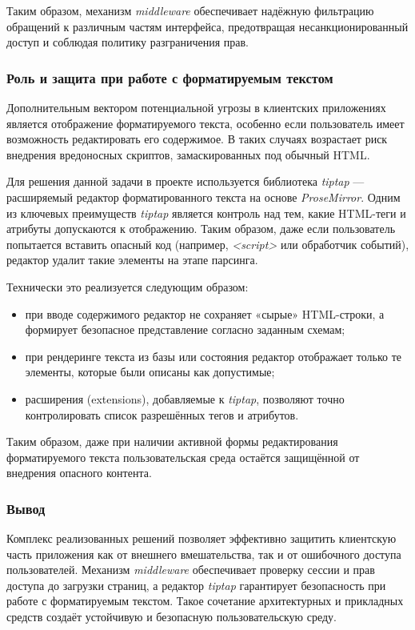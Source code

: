 Таким образом, механизм \textit{middleware} обеспечивает надёжную фильтрацию обращений к различным частям интерфейса, предотвращая несанкционированный доступ и соблюдая политику разграничения прав.

\subsubsection{Роль и защита при работе с форматируемым текстом}
Дополнительным вектором потенциальной угрозы в клиентских приложениях является отображение форматируемого текста, особенно если пользователь имеет возможность редактировать его содержимое. В таких случаях возрастает риск внедрения вредоносных скриптов, замаскированных под обычный HTML.

Для решения данной задачи в проекте используется библиотека \textit{tiptap} — расширяемый редактор форматированного текста на основе \textit{ProseMirror}. Одним из ключевых преимуществ \textit{tiptap} является контроль над тем, какие HTML-теги и атрибуты допускаются к отображению. Таким образом, даже если пользователь попытается вставить опасный код (например, \textit{<script>} или обработчик событий), редактор удалит такие элементы на этапе парсинга.

Технически это реализуется следующим образом:
\begin{itemize}
  \item при вводе содержимого редактор не сохраняет «сырые» HTML-строки, а формирует безопасное представление согласно заданным схемам;
  \item при рендеринге текста из базы или состояния редактор отображает только те элементы, которые были описаны как допустимые;
  \item расширения (extensions), добавляемые к \textit{tiptap}, позволяют точно контролировать список разрешённых тегов и атрибутов.
\end{itemize}

Таким образом, даже при наличии активной формы редактирования форматируемого текста пользовательская среда остаётся защищённой от внедрения опасного контента.

\subsubsection{Вывод}

Комплекс реализованных решений позволяет эффективно защитить клиентскую часть приложения как от внешнего вмешательства, так и от ошибочного доступа пользователей. Механизм \textit{middleware} обеспечивает проверку сессии и прав доступа до загрузки страниц, а редактор \textit{tiptap} гарантирует безопасность при работе с форматируемым текстом. Такое сочетание архитектурных и прикладных средств создаёт устойчивую и безопасную пользовательскую среду.
